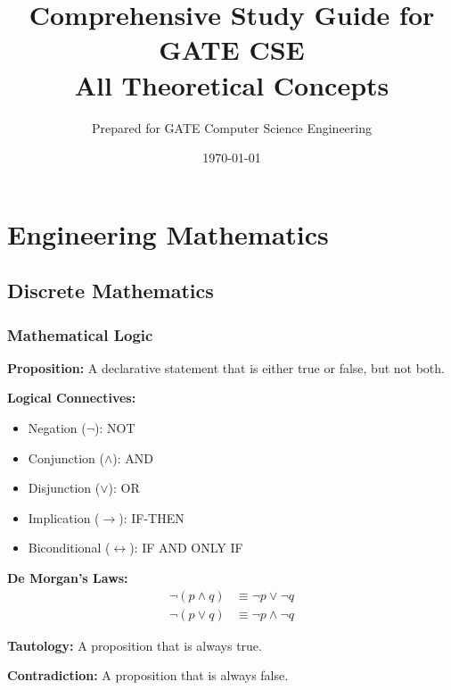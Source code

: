 \documentclass[11pt,a4paper]{article}
\title{\textbf{Comprehensive Study Guide for GATE CSE}\\
\large All Theoretical Concepts}
\author{Prepared for GATE Computer Science Engineering}
\date{\today}
\begin{document}
\maketitle
\newpage

\tableofcontents
\newpage

\section{Engineering Mathematics}

\subsection{Discrete Mathematics}

\subsubsection{Mathematical Logic}

\begin{defbox}
\textbf{Proposition:} A declarative statement that is either true or false, but not both.
\end{defbox}

\textbf{Logical Connectives:}
\begin{itemize}
    \item Negation ($\neg$): NOT
    \item Conjunction ($\wedge$): AND
    \item Disjunction ($\vee$): OR
    \item Implication ($\rightarrow$): IF-THEN
    \item Biconditional ($\leftrightarrow$): IF AND ONLY IF
\end{itemize}

\begin{formulabox}
\textbf{De Morgan's Laws:}
\begin{align*}
    \neg(p \wedge q) &\equiv \neg p \vee \neg q \\
    \neg(p \vee q) &\equiv \neg p \wedge \neg q
\end{align*}
\end{formulabox}

\textbf{Tautology:} A proposition that is always true.

\textbf{Contradiction:} A proposition that is always false.
\end{document}
